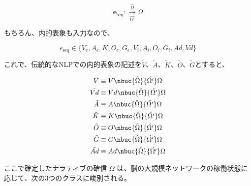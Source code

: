 \begin{equation}
    \boldsymbol{e}_{\mathrm{seq}} :\xrightarrow[\hat{\Omega'}]{\hat{\Omega}} \Omega
    \label{eq:macro_omega}
\end{equation}

もちろん、内的表象も入力なので、

\begin{equation}
    e_{\mathrm{seq}} \in \{V_e,A_e,K,O_e,G_e,V_i,A_i,O_i,G_i,Ad,Vd\}
\end{equation}

これで、伝統的なNLPでの内的表象の記述を$\tilde{V}$、$\tilde{A}$、$\tilde{K}$、$\tilde{O}$、$\tilde{G}$とすると、

\begin{align}
    \tilde{V} &\equiv V \nbuc{\hat{\Omega}}{\hat{\Omega'}} \Omega \\
    \tilde{Vd} &\equiv Vd \nbuc{\hat{\Omega}}{\hat{\Omega'}} \Omega \\
    \tilde{A} &\equiv A \nbuc{\hat{\Omega}}{\hat{\Omega'}} \Omega \\
    \tilde{K} &\equiv K \nbuc{\hat{\Omega}}{\hat{\Omega'}} \Omega \\
    \tilde{O} &\equiv O \nbuc{\hat{\Omega}}{\hat{\Omega'}} \Omega \\
    \tilde{G} &\equiv G \nbuc{\hat{\Omega}}{\hat{\Omega'}} \Omega \\
    \tilde{Ad} &\equiv Ad \nbuc{\hat{\Omega}}{\hat{\Omega'}} \Omega \\
\end{align}



ここで確定したナラティブの確信 $\Omega$ は、脳の大規模ネットワークの稼働状態に応じて、次の3つのクラスに峻別される。

